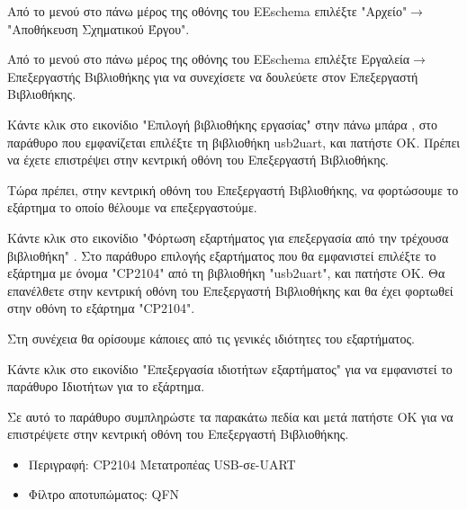 \documentclass[a4paper]{article}
\begin{document}
Από το μενού στο πάνω μέρος της οθόνης του EEschema επιλέξτε "Αρχείο"$\rightarrow$"Αποθήκευση Σχηματικού Έργου".

Από το μενού στο πάνω μέρος της οθόνης του EEschema επιλέξτε Εργαλεία$\rightarrow$Επεξεργαστής Βιβλιοθήκης για να συνεχίσετε να δουλεύετε στον Επεξεργαστή Βιβλιοθήκης.

Κάντε κλικ στο εικονίδιο "Επιλογή βιβλιοθήκης εργασίας" στην πάνω μπάρα %
, στο παράθυρο που εμφανίζεται επιλέξτε τη βιβλιοθήκη usb2uart, και πατήστε ΟΚ. Πρέπει να έχετε επιστρέψει στην κεντρική οθόνη του Επεξεργαστή Βιβλιοθήκης.

\begin{figure}
  \begin{center}
    \label{fig:kicad-main}
  \end{center}
\end{figure}

Τώρα πρέπει, στην κεντρική οθόνη του Επεξεργαστή Βιβλιοθήκης, να φορτώσουμε το εξάρτημα το οποίο θέλουμε να επεξεργαστούμε. 

Κάντε κλικ στο εικονίδιο "Φόρτωση εξαρτήματος για επεξεργασία από την τρέχουσα βιβλιοθήκη" %
. Στο παράθυρο επιλογής εξαρτήματος που θα εμφανιστεί επιλέξτε το εξάρτημα με όνομα "CP2104" από τη βιβλιοθήκη "usb2uart", και πατήστε ΟΚ. Θα επανέλθετε στην κεντρική οθόνη του Επεξεργαστή Βιβλιοθήκης και θα έχει φορτωθεί στην οθόνη το εξάρτημα "CP2104".

Στη συνέχεια θα ορίσουμε κάποιες από τις γενικές ιδιότητες του εξαρτήματος. 

Κάντε κλικ στο εικονίδιο "Επεξεργασία ιδιοτήτων εξαρτήματος" %
για να εμφανιστεί το παράθυρο Ιδιοτήτων για το εξάρτημα. 

\begin{figure}
  \begin{center}
    \label{fig:kicad-main}
  \end{center}
\end{figure}

Σε αυτό το παράθυρο συμπληρώστε τα παρακάτω πεδία και μετά πατήστε ΟΚ για να επιστρέψετε στην κεντρική οθόνη του Επεξεργαστή Βιβλιοθήκης.

\begin{itemize}
    \item Περιγραφή: CP2104 Μετατροπέας USB-σε-UART
    \item Φίλτρο αποτυπώματος: QFN
\end{itemize}
\end{document}

